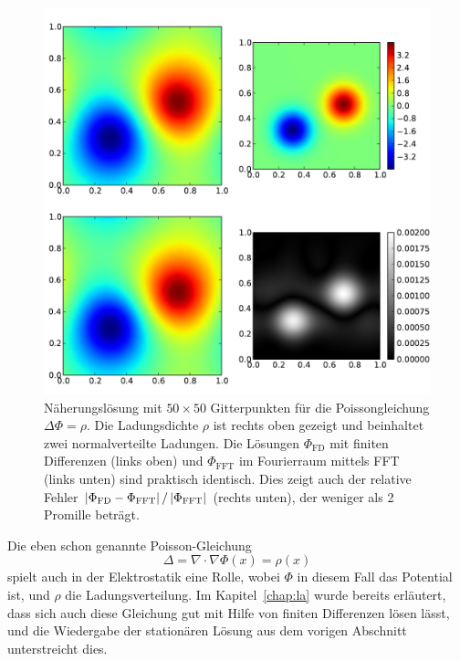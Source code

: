 \begin{figure}
  \centering
  \includegraphics[width=\textwidth]{plots/poisson}
  \caption{Näherungslösung mit $50\times 50$ Gitterpunkten für die
    Poissongleichung $\Delta \Phi=\rho$. Die Ladungsdichte $\rho$ ist
    rechts oben gezeigt und beinhaltet zwei normalverteilte
    Ladungen. Die Lösungen $\Phi_\text{FD}$ mit finiten Differenzen
    (links oben) und $\Phi_\text{FFT}$ im Fourierraum mittels FFT
    (links unten) sind praktisch identisch. Dies zeigt auch der
    relative Fehler $\left\lvert{\Phi_\text{FD} -
      \Phi_\text{FFT}}\right\rvert/\left\lvert{\Phi_\text{FFT}}\right\rvert$ (rechts unten), der
    weniger als 2 Promille beträgt. }
  \label{fig:poisson}
\end{figure}

Die eben schon genannte Poisson-Gleichung
\begin{equation}
  \label{eq:poissonreal}
  \Delta = \nabla \cdot \nabla \Phi(x)  = \rho(x)
\end{equation}
spielt auch in der Elektrostatik eine Rolle, wobei $\Phi$ in diesem
Fall das Potential ist, und $\rho$ die Ladungsverteilung. Im
Kapitel~\ref{chap:la} wurde bereits erläutert, dass sich auch diese
Gleichung gut mit Hilfe von finiten Differenzen lösen lässt, und die
Wiedergabe der stationären Lösung aus dem vorigen Abschnitt
unterstreicht dies.

